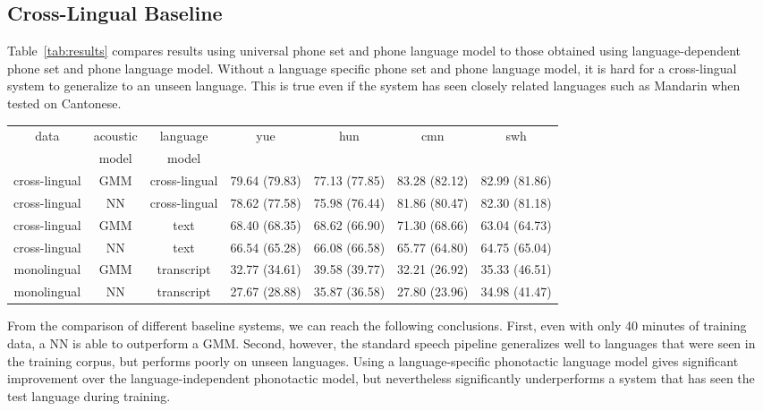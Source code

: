 \subsection{Cross-Lingual Baseline}
\label{s6:mlbaseline}

Table~\ref{tab:results} compares results using universal phone set and
phone language model to those obtained using language-dependent phone
set and phone language model.  Without a language specific phone set
and phone language model, it is hard for a cross-lingual system to
generalize to an unseen language.  This is true even if the system has
seen closely related languages such as Mandarin when tested on
Cantonese.  

\begin{table*}
\begin{center}
\begin{tabular}{|c|c|c|cccc|}
\hline
data & acoustic & language & yue & hun & cmn & swh \\
 & model & model &  & & & \\
\hline
cross-lingual & GMM & cross-lingual & 79.64 (79.83) & 77.13 (77.85) & 83.28 (82.12) & 82.99 (81.86) \\
cross-lingual & NN & cross-lingual & 78.62 (77.58) & 75.98 (76.44) & 81.86 (80.47) & 82.30 (81.18) \\
cross-lingual & GMM & text & 68.40 (68.35) & 68.62 (66.90) & 71.30 (68.66) & 63.04 (64.73) \\
cross-lingual & NN & text & 66.54 (65.28) & 66.08 (66.58) & 65.77 (64.80) & 64.75 (65.04) \\
\hline
monolingual & GMM & transcript & 32.77 (34.61) & 39.58 (39.77) & 32.21 (26.92) & 35.33 (46.51) \\
monolingual & NN & transcript & 27.67 (28.88) & 35.87 (36.58) & 27.80 (23.96) & 34.98 (41.47) \\
\hline
\end{tabular}
\caption{\label{tab:results} PERs of unadapted cross-lingual systems on
  the evaluation sets along with monolingual systems.  PERs on the
  development sets are in parentheses.  Text-based language models are
  trained using phone sequences computed by applying a G2P to
  independent wikipedia texts in the target language. Transcript-based
  language models are trained using phone sequences computed by
  applying a G2P to native transcripts of the training data.}
\end{center}
\end{table*}

From the comparison of different baseline systems, we can reach the
following conclusions.  First, even with only 40 minutes of
training data, a NN is able to outperform a GMM.  Second,
however, the standard speech pipeline generalizes well to languages
that were seen in the training corpus, but performs poorly on unseen
languages.  Using a language-specific phonotactic language model gives
significant improvement over the language-independent phonotactic
model, but nevertheless significantly underperforms a system that
has seen the test language during training.  

